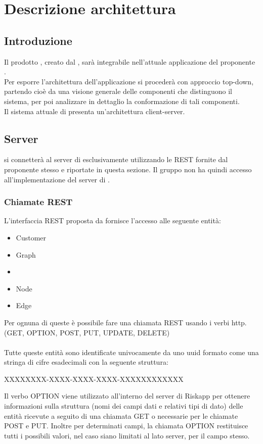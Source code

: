 \newpage

\section{Descrizione architettura}
\label{descrizione_architettura}
\subsection{Introduzione}
Il prodotto \progetto{}, creato dal  \zephyrus{}, sarà integrabile nell'attuale applicazione del proponente \riskapp{}.
\\Per esporre l'architettura dell'applicazione si procederà con approccio top-down, partendo cioè da una visione generale delle componenti che distinguono il sistema, per poi analizzare in dettaglio la conformazione di tali componenti.
\\Il sistema attuale di \riskapp{} presenta un'architettura client-server.
\subsection{Server}
\progetto{} si connetterà al server di \riskapp{} esclusivamente utilizzando le  REST fornite dal proponente stesso e riportate in questa sezione. Il gruppo non ha quindi accesso all'implementazione del server di \riskapp{}.
\subsubsection{Chiamate REST}
L'interfaccia REST proposta da \riskapp{} fornisce l'accesso alle seguente entità:
\begin{itemize}
	\item Customer
	\item Graph
	\item {}
	\item Node
	\item Edge
\end{itemize}
Per ognuna di queste è possibile fare una chiamata REST usando i verbi http. (GET, OPTION, POST, PUT, UPDATE, DELETE)\\\\
Tutte queste entità sono identificate univocamente da uno uuid formato come una stringa di cifre esadecimali con la seguente struttura:
\begin{center}
	XXXXXXXX-XXXX-XXXX-XXXX-XXXXXXXXXXXX
\end{center}
Il verbo OPTION viene utilizzato all'interno del server di Riskapp per ottenere informazioni sulla struttura (nomi dei campi dati e relativi tipi di dato) delle entità ricevute a seguito di una chiamata GET o necessarie per le chiamate POST e PUT.
Inoltre per determinati campi, la chiamata OPTION restituisce tutti i possibili valori, nel caso siano limitati al lato server, per il campo stesso.

